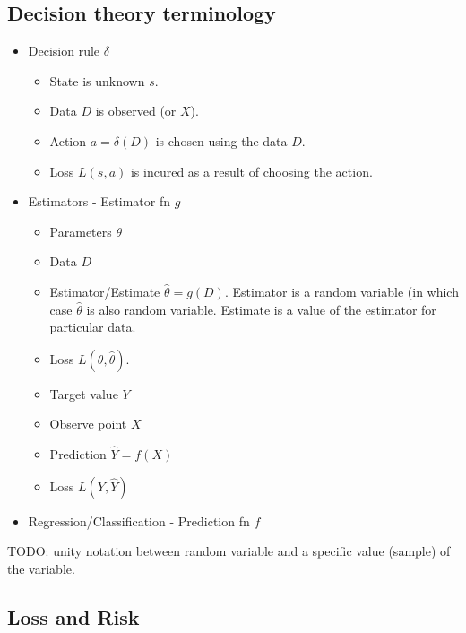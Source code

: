 \subsection{Decision theory terminology}

\begin{itemize}
    \item Decision rule $\delta$
        \begin{itemize}
            \item State is unknown $s$.
            \item Data $D$ is observed (or $X$).
            \item Action $a = \delta(D)$ is chosen using the data $D$.
            \item Loss $L(s, a)$ is incured as a result of choosing the action.
        \end{itemize}
    \item Estimators - Estimator fn $g$
        \begin{itemize}
            \item Parameters $\theta$
            \item Data $D$
            \item Estimator/Estimate $\hat{\theta} = g(D)$. Estimator is a random variable (in which case $\hat{\theta}$ is also random variable. Estimate is a value of the estimator for particular data.
            \item Loss $L(\theta, \hat{\theta})$.
        \end{itemize}
            \begin{itemize}
                \item Target value $Y$
                \item Observe point $X$
                \item Prediction $\hat{Y} = f(X)$
                \item Loss $L(Y, \hat{Y})$
            \end{itemize}
    \item Regression/Classification - Prediction fn $f$
\end{itemize}

TODO: unity notation between random variable and a specific value (sample) of the variable.


\subsection{Loss and Risk}

